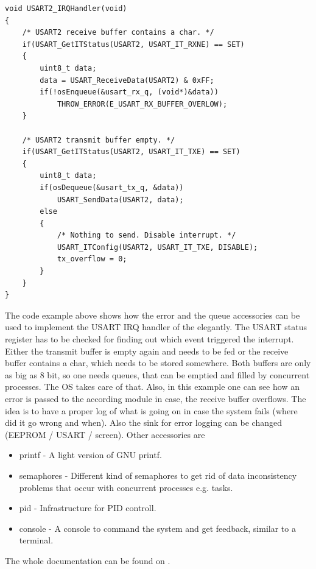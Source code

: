\begin{verbatim}
void USART2_IRQHandler(void)
{
	/* USART2 receive buffer contains a char. */
	if(USART_GetITStatus(USART2, USART_IT_RXNE) == SET)
	{
		uint8_t data;
		data = USART_ReceiveData(USART2) & 0xFF;
		if(!osEnqueue(&usart_rx_q, (void*)&data))
			THROW_ERROR(E_USART_RX_BUFFER_OVERLOW);
	}

	/* USART2 transmit buffer empty. */
	if(USART_GetITStatus(USART2, USART_IT_TXE) == SET)
	{
		uint8_t data;
		if(osDequeue(&usart_tx_q, &data))
			USART_SendData(USART2, data);
		else
		{
			/* Nothing to send. Disable interrupt. */
			USART_ITConfig(USART2, USART_IT_TXE, DISABLE);
			tx_overflow = 0;
		}
	}
}
\end{verbatim}
The code example above shows how the error and the queue accessories can be used to implement the \gls{USART} \gls{IRQ} handler of the  elegantly. The \gls{USART} status register has to be checked for finding out which event triggered the interrupt. Either the transmit buffer is empty again and needs to be fed or the receive buffer contains a char, which needs to be stored somewhere. Both buffers are only as big as 8 bit, so one needs queues, that can be emptied and filled by concurrent processes. The \gls{OS} takes care of that. Also, in this example one can see how an error is passed to the according module in case, the receive buffer overflows. The idea is to have a proper log of what is going on in case the system fails (where did it go wrong and when). Also the sink for error logging can be changed (\gls{EEPROM} / \gls{USART} / screen).
\newpar 
Other accessories are 
\begin{itemize}
\item printf - A light version of \gls{GNU} printf. 
\item semaphores - Different kind of semaphores to get rid of data inconsistency problems that occur with concurrent processes e.g. tasks. 
\item pid - Infrastructure for \gls{PID} controll. 
\item console - A console to command the system and get feedback, similar to a terminal. 
\end{itemize}

The whole  documentation can be found on . 


